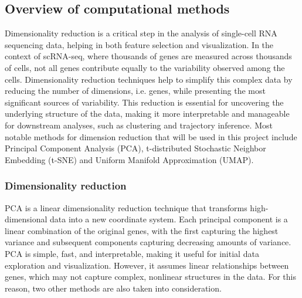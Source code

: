\documentclass[11pt]{article}
\begin{document}
\subsection{Overview of computational methods}
\begin{multicols}{2}
    \noindent
    Dimensionality reduction is a critical step in the analysis of single-cell RNA sequencing data, helping in both feature selection and visualization. In the context of scRNA-seq, where thousands of genes are measured across thousands of cells, not all genes contribute equally to the variability observed among the cells. Dimensionality reduction techniques help to simplify this complex data by reducing the number of dimensions, i.e. genes, while presenting the most significant sources of variability. This reduction is essential for uncovering the underlying structure of the data, making it more interpretable and manageable for downstream analyses, such as clustering and trajectory inference. Most notable methods for dimension reduction that will be used in this project include Principal Component Analysis (PCA), t-distributed Stochastic Neighbor Embedding (t-SNE) and Uniform Manifold Approximation (UMAP).

    \subsubsection{Dimensionality reduction}
    \noindent
    PCA is a linear dimensionality reduction technique that transforms high-dimensional data into a new coordinate system\cite{pearson_liii_1901}. Each principal component is a linear combination of the original genes, with the first capturing the highest variance and subsequent components capturing decreasing amounts of variance. PCA is simple, fast, and interpretable, making it useful for initial data exploration and visualization. However, it assumes linear relationships between genes, which may not capture complex, nonlinear structures in the data. For this reason, two other methods are also taken into consideration.


\end{multicols}
\end{document}
